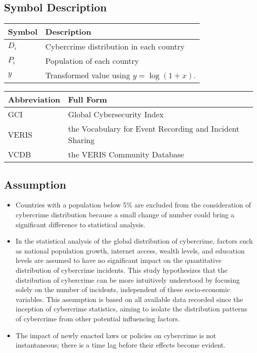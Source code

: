\subsection{Symbol Description}\label{subsec:symbol-description} %
\begin{tabular}{ll}
    \textbf{Symbol} & \textbf{Description} \\
    \hline
    $D_i$ & Cybercrime distribution in each country \\
    $P_i$ & Population of each country \\
    $y$   & Transformed value using \( y = \log(1 + x) \). \\
\end{tabular}

\bigskip

\noindent
\begin{tabular}{ll}
    \textbf{Abbreviation} & \textbf{Full Form} \\
    \hline
    GCI   & Global Cybersecurity Index\cite{gci-2024} \\
    VERIS & the Vocabulary for Event Recording and Incident Sharing\cite{veris} \\
    VCDB  & the VERIS Community Database\cite{vcdb} \\
\end{tabular}
\subsection{Assumption}\label{subsec:assumption} %
\begin{itemize}
    \item Countries with a population below 5\% are excluded from the consideration of cybercrime distribution because
        a small change of number could bring a significant difference to statistical analysis.
    \item In the statistical analysis of the global distribution of cybercrime,
        factors such as national population growth, internet access, wealth levels, and education levels
        are assumed to have no significant impact on the quantitative distribution of cybercrime incidents.
        This study hypothesizes that the distribution of cybercrime can be more intuitively understood by focusing solely on the number of incidents,
        independent of these socio-economic variables.
        This assumption is based on all available data recorded since the inception of cybercrime statistics,
        aiming to isolate the distribution patterns of cybercrime from other potential influencing factors.
    \item The impact of newly enacted laws or policies on cybercrime is not instantaneous;
        there is a time lag before their effects become evident.
\end{itemize}
